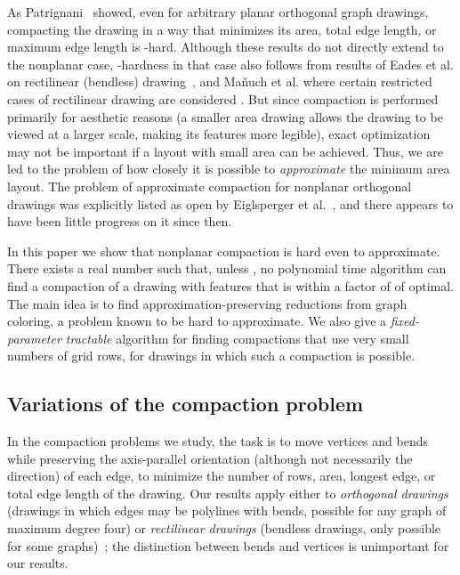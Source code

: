 \documentclass[12pt]{article}
\theoremstyle{definitions}
\begin{document}
As Patrignani~\cite{Patrignani:1999} showed, even for arbitrary planar orthogonal graph drawings, compacting the drawing in a way that minimizes its area, total edge length, or maximum edge length is -hard. Although these results do not directly extend to the nonplanar case, -hardness in that case also follows from results of Eades et al. on rectilinear (bendless) drawing~\cite{Eades:2010}, and Ma{\v{n}}uch et al. where certain restricted cases of rectilinear drawing are considered \cite{Manuch:2011}.
But since compaction is performed primarily for aesthetic reasons (a smaller area drawing allows the drawing to be viewed at a larger scale, making its features more legible), exact optimization may not be important if a layout with small area can be achieved. Thus, we are led to the problem of how closely it is possible to \emph{approximate} the minimum area layout.
The problem of approximate compaction for nonplanar orthogonal drawings was explicitly listed as open by Eiglsperger et al.~\cite{Eiglsperger:2001}, and there appears to have been little progress on it since then.

In this paper we show that nonplanar compaction is hard even to approximate.
There exists a real number  such that, unless , no polynomial time
algorithm can find a compaction of a drawing with  features that is within a
factor of  of optimal. The main idea is to find approximation-preserving
reductions from graph coloring, a problem known to be hard to approximate. We
also give a \emph{fixed-parameter tractable} algorithm for finding compactions 
that use very small numbers of grid rows, for drawings in which such a compaction is possible.

\subsection{Variations of the compaction problem}

In the compaction problems we study, the task is to move vertices and bends
while preserving the axis-parallel orientation (although not necessarily the
direction) of each edge, to minimize the number of rows, area, longest edge,
or total edge length of the
drawing. Our results apply either to \emph{orthogonal drawings} (drawings in
which edges may be polylines with bends, possible for any graph of maximum
degree four) or \emph{rectilinear drawings} (bendless drawings,  only
possible for some graphs)~\cite{Eades:2010,Eppstein:2009}; the distinction
between bends and vertices is unimportant for our results.
\end{document}
